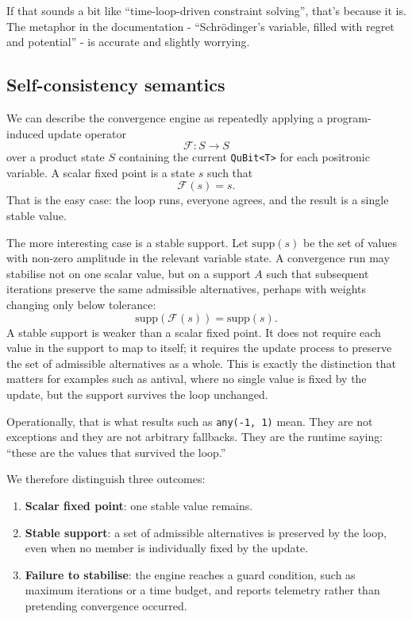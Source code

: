 \documentclass[a4paper,11pt]{article}
\begin{document}
If that sounds a bit like ``time-loop-driven constraint solving'', that's because it is. The metaphor in the documentation - ``Schrödinger's variable, filled with regret and potential'' - is accurate and slightly worrying. 

\subsection{Self-consistency semantics}
\label{sec:pv-self-consistency}

We can describe the convergence engine as repeatedly applying a program-induced
update operator
\[
  \mathcal{F}: S \rightarrow S
\]
over a product state \(S\) containing the current \texttt{QuBit<T>} for each
positronic variable. A scalar fixed point is a state \(s\) such that
\[
  \mathcal{F}(s) = s.
\]
That is the easy case: the loop runs, everyone agrees, and the result is a single
stable value.

The more interesting case is a stable support. Let \(\mathrm{supp}(s)\) be the set
of values with non-zero amplitude in the relevant variable state. A convergence
run may stabilise not on one scalar value, but on a support \(A\) such that
subsequent iterations preserve the same admissible alternatives, perhaps with
weights changing only below tolerance:
\[
  \mathrm{supp}(\mathcal{F}(s)) = \mathrm{supp}(s).
\]
A stable support is weaker than a scalar fixed point. It does not require each
value in the support to map to itself; it requires the update process to preserve
the set of admissible alternatives as a whole. This is exactly the distinction
that matters for examples such as antival, where no single value is fixed by the
update, but the support survives the loop unchanged.

Operationally, that is what results such as \texttt{any(-1, 1)} mean. They are not
exceptions and they are not arbitrary fallbacks. They are the runtime saying:
``these are the values that survived the loop.''

We therefore distinguish three outcomes:

\begin{enumerate}
\item
  \textbf{Scalar fixed point}: one stable value remains.
\item
  \textbf{Stable support}: a set of admissible alternatives is preserved by the
  loop, even when no member is individually fixed by the update.
\item
  \textbf{Failure to stabilise}: the engine reaches a guard condition, such as
  maximum iterations or a time budget, and reports telemetry rather than pretending
  convergence occurred.
\end{enumerate}
\end{document}

